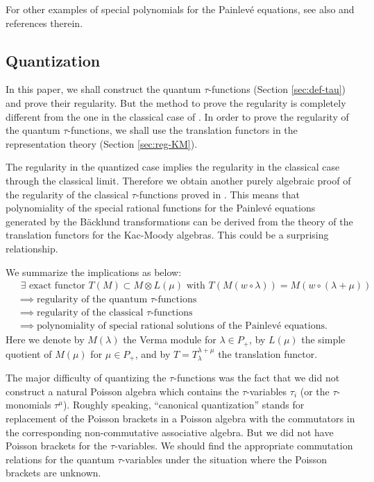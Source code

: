 \documentclass[12pt,twoside]{article}
\theoremstyle{plain} %
\theoremstyle{definition} %
\theoremstyle{definition} %
\numberwithin{theorem}{section}
\numberwithin{equation}{section}
\numberwithin{figure}{section}
\numberwithin{table}{section}
\newcommand\secref[1]{Section \ref{#1}}
\begin{document}
For other examples of special polynomials for the Painlev\'e equations, 
see also \cite{Yamada-SP} and references therein.


\subsection{Quantization}

In this paper, we shall construct the quantum $\tau$-functions 
(\secref{sec:def-tau}) and prove their regularity.  
But the method to prove the regularity is completely different
from the one in the classical case of \cite{NY0012028}.
In order to prove the regularity of the quantum $\tau$-functions, 
we shall use the translation functors in the representation theory
(\secref{sec:reg-KM}). 

The regularity in the quantized case implies the regularity in the classical case
through the classical limit.
Therefore we obtain another purely algebraic proof of the regularity 
of the classical $\tau$-functions proved in \cite{NY0012028}.
This means that polynomiality of the special rational functions 
for the Painlev\'e equations generated by the B\"acklund transformations 
can be derived from the theory of the translation functors for the Kac-Moody algebras.
This could be a surprising relationship.

We summarize the implications as below:
\begin{align*}
 &
 \text{
   $\exists$ exact functor 
   $T(M)\subset M\otimes L(\mu)$ with 
   $T(M(w\circ\lambda))=M(w\circ(\lambda+\mu))$
 }
 \\ &
 \implies
 \text{regularity of the quantum $\tau$-functions}
 \\ &
 \implies
 \text{regularity of the classical $\tau$-functions}
 \\ &
 \implies
 \text{polynomiality of special rational solutions of the Painlev\'e equations}.
\end{align*}
Here we denote by $M(\lambda)$ the Verma module for $\lambda\in P_+$, 
by $L(\mu)$ the simple quotient of $M(\mu)$ for $\mu\in P_+$,
and by $T=T_\lambda^{\lambda+\mu}$ the translation functor.

The major difficulty of quantizing the $\tau$-functions was the fact that
we did not construct a natural Poisson algebra which contains the $\tau$-variables $\tau_i$
(or the $\tau$-monomials $\tau^\mu$).
Roughly speaking, ``canonical quantization'' stands for
replacement of the Poisson brackets in a Poisson algebra
with the commutators in the corresponding non-commutative associative algebra.
But we did not have Poisson brackets for the $\tau$-variables.
We should find the appropriate commutation relations for the quantum $\tau$-variables
under the situation where the Poisson brackets are unknown.
\end{document}

